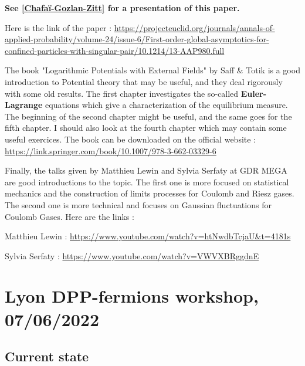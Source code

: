 \documentclass[a4paper,12pt]{report}
\begin{document}
\textbf{See \ref{Chafaï-Gozlan-Zitt} for a presentation of this paper.}

Here is the link of the paper : \href{https://projecteuclid.org/journals/annals-of-applied-probability/volume-24/issue-6/First-order-global-asymptotics-for-confined-particles-with-singular-pair/10.1214/13-AAP980.full}{https://projecteuclid.org/journals/annals-of-applied-probability/volume-24/issue-6/First-order-global-asymptotics-for-confined-particles-with-singular-pair/10.1214/13-AAP980.full}
\vspace{0.5cm}

The book "Logarithmic Potentials with External Fields" by Saff \& Totik \cite{saff-totik} is a good introduction to Potential theory that may be useful, and they deal rigorously with some old results. The first chapter investigates the so-called \textbf{Euler-Lagrange} equations which give a characterization of the equilibrium measure. The beginning of the second chapter might be useful, and the same goes for the fifth chapter. I should also look at the fourth chapter which may contain some useful exercices. The book can be downloaded on the official website : \href{https://link.springer.com/book/10.1007/978-3-662-03329-6}{https://link.springer.com/book/10.1007/978-3-662-03329-6}
\vspace{0.5cm}


Finally, the talks given by Matthieu Lewin and Sylvia Serfaty at GDR MEGA are good introductions to the topic. The first one is more focused on statistical mechanics and the construction of limits processes for Coulomb and Riesz gases. The second one is more technical and focuses on Gaussian fluctuations for Coulomb Gases. Here are the links : 

Matthieu Lewin : \href{https://www.youtube.com/watch?v=htNwdbTcjaU\&t=4181s}{https://www.youtube.com/watch?v=htNwdbTcjaU\&t=4181s}

Sylvia Serfaty : \href{https://www.youtube.com/watch?v=VWVXBRggdnE}{https://www.youtube.com/watch?v=VWVXBRggdnE}




\section{Lyon DPP-fermions workshop, 07/06/2022}\label{meet:0706}

\subsection*{Current state}
\end{document}
